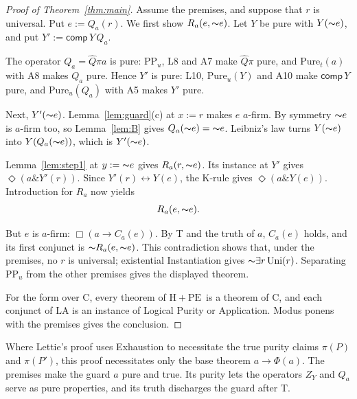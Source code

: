 \documentclass[12pt,leqno]{article}
\newcommand{\AND}{\ensuremath{\mathbin{\&}}}
\newcommand{\IFF}{\ensuremath{\leftrightarrow}}
\newcommand{\IC}{\ensuremath{\rightarrow}}
\newcommand{\NOT}{\ensuremath{\text{$\thicksim$}}}
\newcommand{\Pure}{\ensuremath{\mathrm{Pure}}}
\newcommand{\Uni}{\ensuremath{\mathrm{Uni}}}
\newcommand{\PPu}{\ensuremath{\mathrm{PP}_u}}
\newcommand{\HPE}{\ensuremath{\mathrm{H}+\mathrm{PE}}}
\newcommand{\hQ}{\ensuremath{\widehat{Q}}}
\newcommand{\cmp}{\ensuremath{\mathsf{comp}}}
\theoremstyle{plain}
\begin{document}
\begin{proof}[Proof of Theorem~\ref{thm:main}]
Assume the premises, and suppose that \(r\) is universal. Put
\(e:=Q_a(r)\). We first show \(R_a(e,\NOT e)\). Let \(Y\) be pure with
\(Y(\NOT e)\), and put \(Y':=\cmp\,Y\,Q_a\).

The operator \(Q_a=\hQ\pi a\) is pure: \(\PPu\), L8 and A7 make
\(\hQ\pi\) pure, and \(\Pure_t(a)\) with A8 makes \(Q_a\) pure. Hence
\(Y'\) is pure: L10, \(\Pure_u(Y)\) and A10 make \(\cmp\,Y\) pure, and
\(\Pure_u(Q_a)\) with A5 makes \(Y'\) pure.

Next, \(Y'(\NOT e)\). Lemma~\ref{lem:guard}(c) at \(x:=r\) makes \(e\)
\(a\)-firm. By symmetry \(\NOT e\) is \(a\)-firm too, so
Lemma~\ref{lem:B} gives \(Q_a(\NOT e)=\NOT e\). Leibniz's law turns
\(Y(\NOT e)\) into \(Y(Q_a(\NOT e))\), which is \(Y'(\NOT e)\).

Lemma~\ref{lem:step1} at \(y:=\NOT e\) gives \(R_a(r,\NOT e)\). Its
instance at \(Y'\) gives \(\Diamond(a\AND Y'(r))\). Since
\(Y'(r)\IFF Y(e)\), the K-rule gives \(\Diamond(a\AND Y(e))\).
Introduction for \(R_a\) now yields
\[
 R_a(e,\NOT e).
\]

But \(e\) is \(a\)-firm: \(\Box(a\IC C_a(e))\). By T and the truth of
\(a\), \(C_a(e)\) holds, and its first conjunct is
\(\NOT R_a(e,\NOT e)\). This contradiction shows that, under the
premises, no \(r\) is universal; existential Instantiation gives
\(\NOT\exists r\,\Uni(r)\). Separating \(\PPu\) from the other premises
gives the displayed theorem.

For the form over C, every theorem of \HPE\ is a theorem of C, and each
conjunct of \(\mathrm{LA}\) is an instance of Logical Purity or
Application. Modus ponens with the premises gives the conclusion.
\end{proof}

Where Lettie's proof uses Exhaustion to necessitate the true purity
claims \(\pi(P)\) and \(\pi(P')\), this proof necessitates only the base
theorem \(a\IC\Phi(a)\). The premises make the guard \(a\) pure and
true. Its purity lets the operators \(Z_Y\) and \(Q_a\) serve as pure
properties, and its truth discharges the guard after T.
\end{document}
